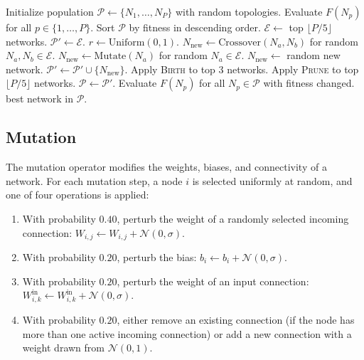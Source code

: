 \begin{algorithm}[h]
  \caption{ModNet Evolution}
  \label{alg:evolution}
  \begin{algorithmic}[1]
    \State Initialize population $\mathcal{P} \gets \{N_1, \ldots, N_P\}$
      with random topologies.
    \State Evaluate $F(N_p)$ for all $p \in \{1, \ldots, P\}$.
      \State Sort $\mathcal{P}$ by fitness in descending order.
      \State $\mathcal{E} \gets$ top $\lfloor P/5 \rfloor$ networks.
      \State $\mathcal{P}' \gets \mathcal{E}$.
        \State $r \gets \text{Uniform}(0, 1)$.
          \State $N_{\text{new}} \gets \text{Crossover}(N_a, N_b)$
            for random $N_a, N_b \in \mathcal{E}$.
          \State $N_{\text{new}} \gets \text{Mutate}(N_a)$
            for random $N_a \in \mathcal{E}$.
        \Else
          \State $N_{\text{new}} \gets$ random new network.
        \EndIf
        \State $\mathcal{P}' \gets \mathcal{P}' \cup \{N_{\text{new}}\}$.
      \EndWhile
        \State Apply \textsc{Birth} to top 3 networks.
      \EndIf
        \State Apply \textsc{Prune} to top $\lfloor P/5 \rfloor$ networks.
      \EndIf
      \State $\mathcal{P} \gets \mathcal{P}'$.
      \State Evaluate $F(N_p)$ for all $N_p \in \mathcal{P}$
        with fitness changed.
    \EndFor
    \State \Return best network in $\mathcal{P}$.
  \end{algorithmic}
\end{algorithm}

\subsection{Mutation}

The mutation operator modifies the weights, biases, and connectivity
of a network. For each mutation step, a node $i$ is selected uniformly
at random, and one of four operations is applied:

\begin{enumerate}
  \item With probability $0.40$, perturb the weight of a randomly
    selected incoming connection: $W_{i,j} \gets W_{i,j} +
    \mathcal{N}(0, \sigma)$.
  \item With probability $0.20$, perturb the bias:
    $b_i \gets b_i + \mathcal{N}(0, \sigma)$.
  \item With probability $0.20$, perturb the weight of an input
    connection: $W^{\text{in}}_{i,k} \gets W^{\text{in}}_{i,k} +
    \mathcal{N}(0, \sigma)$.
  \item With probability $0.20$, either remove an existing connection
    (if the node has more than one active incoming connection) or add
    a new connection with a weight drawn from $\mathcal{N}(0, 1)$.
\end{enumerate}

